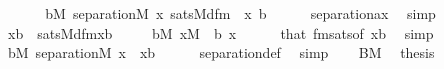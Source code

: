 \begin{isabellebody}
\ \ \isamarkupfalse%
\isanewline
\ \ \isamarkupfalse%
\ {\isachardoublequoteopen}{\isasymforall}b{\isasymin}M{\isachardot}{\kern0pt}\ separation{\isacharparenleft}{\kern0pt}{\isacharhash}{\kern0pt}{\isacharhash}{\kern0pt}M{\isacharcomma}{\kern0pt}\ {\isasymlambda}x{\isachardot}{\kern0pt}\ sats{\isacharparenleft}{\kern0pt}M{\isacharcomma}{\kern0pt}dfm{\isacharparenleft}{\kern0pt}{}{\isacharcomma}{\kern0pt}{}{\isacharparenright}{\kern0pt}\ {\isacharcomma}{\kern0pt}\ {\isacharbrackleft}{\kern0pt}x{\isacharcomma}{\kern0pt}\ b{\isacharbrackright}{\kern0pt}{\isacharparenright}{\kern0pt}{\isacharparenright}{\kern0pt}{\isachardoublequoteclose}\isanewline
\ \ \ \ \isamarkupfalse%
\ separation{\isacharunderscore}{\kern0pt}ax\ \isamarkupfalse%
\ simp\isanewline
\ \ \isamarkupfalse%
\isanewline
\ \ \isamarkupfalse%
\ {\isachardoublequoteopen}x{\isasymnotin}b\ {\isasymlongleftrightarrow}\ sats{\isacharparenleft}{\kern0pt}M{\isacharcomma}{\kern0pt}dfm{\isacharparenleft}{\kern0pt}{}{\isacharcomma}{\kern0pt}{}{\isacharparenright}{\kern0pt}{\isacharcomma}{\kern0pt}{\isacharbrackleft}{\kern0pt}x{\isacharcomma}{\kern0pt}b{\isacharbrackright}{\kern0pt}{\isacharparenright}{\kern0pt}{\isachardoublequoteclose}\isanewline
\ \ \ \ \ {\isachardoublequoteopen}b{\isasymin}M{\isachardoublequoteclose}\ {\isachardoublequoteopen}x{\isasymin}M{\isachardoublequoteclose}\ \ b\ x\isanewline
\ \ \ \ \isamarkupfalse%
\ that\ fmsats{\isacharbrackleft}{\kern0pt}of\ {\isachardoublequoteopen}{\isacharbrackleft}{\kern0pt}x{\isacharcomma}{\kern0pt}b{\isacharbrackright}{\kern0pt}{\isachardoublequoteclose}{\isacharbrackright}{\kern0pt}\ \isamarkupfalse%
\ simp\isanewline
\ \ \isamarkupfalse%
\isanewline
\ \ \isamarkupfalse%
\ {\isachardoublequoteopen}{\isasymforall}b{\isasymin}M{\isachardot}{\kern0pt}\ separation{\isacharparenleft}{\kern0pt}{\isacharhash}{\kern0pt}{\isacharhash}{\kern0pt}M{\isacharcomma}{\kern0pt}\ {\isasymlambda}x\ {\isachardot}{\kern0pt}\ x{\isasymnotin}b{\isacharparenright}{\kern0pt}{\isachardoublequoteclose}\isanewline
\ \ \ \ \isamarkupfalse%
\ separation{\isacharunderscore}{\kern0pt}def\ \isamarkupfalse%
\ simp\isanewline
\ \ \isamarkupfalse%
\ {\isacartoucheopen}B{\isasymin}M{\isacartoucheclose}\ \isamarkupfalse%
\ {\isacharquery}{\kern0pt}thesis\ \isamarkupfalse%

\end{isabellebody}
